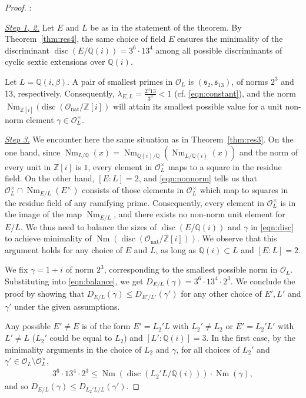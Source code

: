 \documentclass[smallextended]{svjour3}
\newcommand{\Q}{\mathbb{Q}}
\newcommand{\Z}{\mathbb{Z}}
\newcommand{\Or}{\mathcal{O}}
\DeclareMathOperator{\Nm}{Nm}
\DeclareMathOperator{\nat}{nat}
\DeclareMathOperator{\disc}{disc}
\begin{document}
\begin{proof}:

\noindent\emph{\underline{Step 1, 2.}}  
Let $E$ and $L$ be as in the statement of the theorem. By Theorem~\ref{thm:res4}, the same choice of field $E$ ensures the minimality of the discriminant $\disc(E/\Q(i)) = 3^6\cdot 13^4$ among all possible discriminants of cyclic sextic extensions over $\Q(i)$.  
 
Let $L = \Q(i,\beta)$. A pair of smallest primes in $\Or_L$ is $(\mathfrak s_{2}, \mathfrak s_{13})$, of norms $2^3$ and 13, respectively. Consequently, $\lambda_{E,L} = \frac{2^3 13}{3^3} < 1$ (cf. \eqref{eqn:constant}), and the norm $\Nm_{\Z[i]}(\disc(\Or_{\nat}/\Z[i])$ will attain its smallest possible value for a unit non-norm element $\gamma \in \Or_L^{\times}$.

\medskip 

\noindent\emph{\underline{Step 3.}}  
We encounter here the same situation as in Theorem~\ref{thm:res3}. On the one hand, since $\Nm_{L/\Q}(x)=\Nm_{\Q(i)/\Q}(\Nm_{L/\Q(i)}(x))$ and the norm of every unit in $\Z[i]$ is $1$, every element in $\Or_L^{\times}$ maps to a square in the residue field. On the other hand, $[E:L]=2$, and \eqref{eqn:nonnorm} tells us that $\Or_L^{\times}\cap \Nm_{E/L}(E^{\times})$ consists of those elements in $\Or_L^{\times}$ which map to squares in the residue field of any ramifying prime. Consequently, every element in $\Or_L^{\times}$ is in the image of the map $ \Nm_{E/L}$, and there exists no  non-norm unit element for $E/L$. We thus need to balance the sizes of $\disc(E/\Q(i))$ and $\gamma$ in \eqref{eqn:disc} to achieve minimality of $\Nm(\disc(\Or_{\nat}/\Z[i]))$. We observe that this argument holds for any choice of $E$ and $L$, as long as $\Q(i)\subset L$ and $[E:L] = 2$.
 
We fix $\gamma = 1+i$ of norm $2^3$, corresponding to the smallest possible norm in $\Or_L$. Substituting into \eqref{eqn:balance}, we get $D_{E/L}(\gamma) = 3^6\cdot 13^4\cdot 2^3$. We conclude the proof by showing that $D_{E/L}(\gamma) \le D_{E'/L'}(\gamma')$ for any other choice of $E', L'$ and $\gamma'$ under the given assumptions.

  Any possible $E' \ne E$ is of the form $E' = L_2'L$ with $L_2'\ne L_2$ or $E' = L_2'L'$ with $L'\ne L$ ($L_2'$ could be equal to $L_2$) and $[L':\Q(i)] = 3$. In the first case, by the minimality arguments in the choice of $L_2$ and $\gamma$, for all choices of $L_2'$ and $\gamma' \in \Or_L \setminus \Or_L^{\times}$, 
\begin{align*}
	3^6\cdot 13^4\cdot 2^3\le \Nm(\disc(L_2'L/\Q(i))) \cdot \Nm(\gamma),
\end{align*} 
and so $D_{E/L}(\gamma) \le D_{L_2'L/L}(\gamma')$.


\end{proof}
\end{document}
